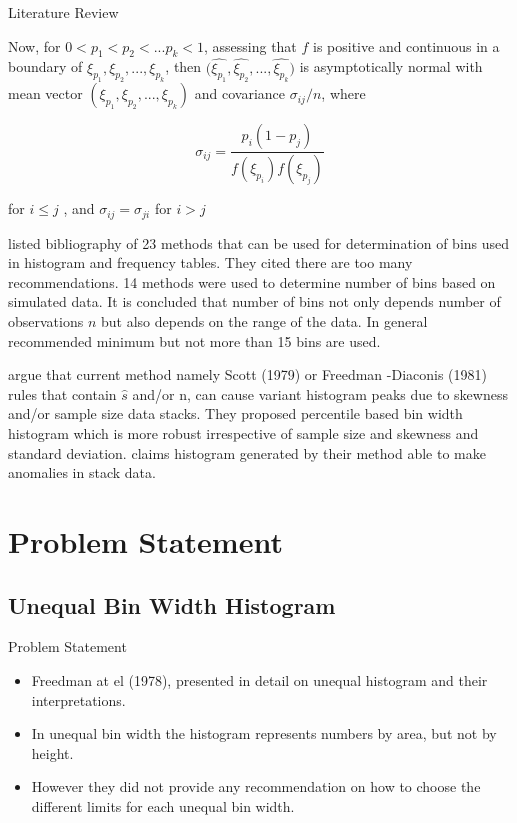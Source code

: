 \documentclass{beamer}
\begin{document}
\begin{frame}[allowframebreaks]{Literature Review}
\begin{itemize}
Now, for $0<p_{1} < p_{2} <...p_{k} < 1$, assessing that $f$ is positive and continuous in a boundary of $\xi_{p_{1}}, \xi_{p_{2}},...,\xi_{p_{k}} $, then $\bigg(\hat{\xi_{p_{1}}}, \hat{\xi_{p_{2}}},...,\hat{\xi_{p_{k}}} \bigg)$ is asymptotically	normal	with		mean	vector  $(\xi_{p_{1}}, \xi_{p_{2}},...,\xi_{p_{k}}) $ and covariance $\sigma_{ij}/n$, where 

\begin{equation}
\sigma_{ij}=\frac{p_{i}(1-p_{j})}{f(\xi_{p_{i}})f(\xi_{p_{j}})}
\end{equation}

for $i \leq j$ , and $\sigma_{ij} = \sigma_{ji}$ for $i>j$ 

\cite{NurhanDoganAfyon2016} listed bibliography of 23 methods that can be used for determination of bins used in histogram and frequency tables. They cited there are too many recommendations. 14 methods were used to determine number of bins based on simulated data. It is concluded that number of bins not only  depends number of observations $n$ but also depends on the range of the data. In general \cite{NurhanDoganAfyon2016} recommended minimum but not more than 15 bins are used. 

\cite{Gunver2017} argue that current method namely Scott (1979) or Freedman -Diaconis (1981) rules that contain $ \hat{s}$ and/or n, can cause variant histogram peaks due to skewness and/or sample size data stacks. They proposed percentile based bin width histogram which is more robust irrespective of sample size and skewness and standard deviation. \cite{Gunver2017} claims histogram generated by their method able to make anomalies in stack data.

\end{itemize}

\end{frame}

\section{Problem Statement}

\subsection{Unequal Bin Width Histogram}
\begin{frame}{Problem Statement}
	\begin{itemize}
		\item Freedman at el (1978), presented in detail on unequal histogram and their interpretations. 
                     \item In unequal bin width the  histogram represents numbers by area, but not by height.
		\item However they did not provide any recommendation on how to choose the different limits for each unequal bin width.
	\end{itemize}
\end{frame}
\end{document}
